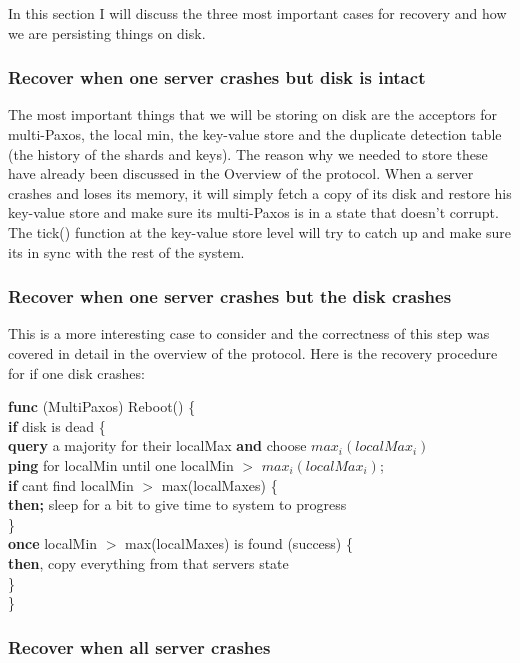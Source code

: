 \documentclass[a4paper]{article}
\begin{document}
In this section I will discuss the three most important cases for recovery and how we are persisting things on disk.

\subsubsection{Recover when one server crashes but disk is intact}
The most important things that we will be storing on disk are the acceptors for multi-Paxos, the local min, the key-value store and the duplicate detection table (the history of the shards and keys).
The reason why we needed to store these have already been discussed in the Overview of the protocol.
When a server crashes and loses its memory, it will simply fetch a copy of its disk and restore his key-value store and make sure its multi-Paxos is in a state that doesn't corrupt.
The tick() function at the key-value store level will try to catch up and make sure its in sync with the rest of the system.

\subsubsection{Recover when one server crashes but the disk crashes}
This is a more interesting case to consider and the correctness of this step was covered in detail in the overview of the protocol.
Here is the recovery procedure for if one disk crashes:
            
\textbf{func} (MultiPaxos) Reboot() \{ \\
\indent \indent \textbf{if} disk is dead \{ \\
\indent \indent \indent \textbf{query} a majority for their  localMax  \textbf{and} choose $max_{i}(localMax_i)$ \\
\indent \indent \indent \textbf{ping} for localMin until one localMin $> $ $max_{i}(localMax_i)$; \\
\indent \indent \indent \textbf{if} cant find localMin $>$ max(localMaxes) \{ \\
\indent \indent \indent \indent \textbf{then;} sleep for a bit to give time to system to progress \\
\indent \indent \indent  \} \\
\indent \indent \indent \textbf{once} localMin $>$ max(localMaxes) is found (success) \{ \\
\indent  \indent \indent \indent \textbf{then}, copy everything from that servers state\\
\indent \indent  \} \\
\indent \}


\subsubsection{Recover when all server crashes}
\end{document}
